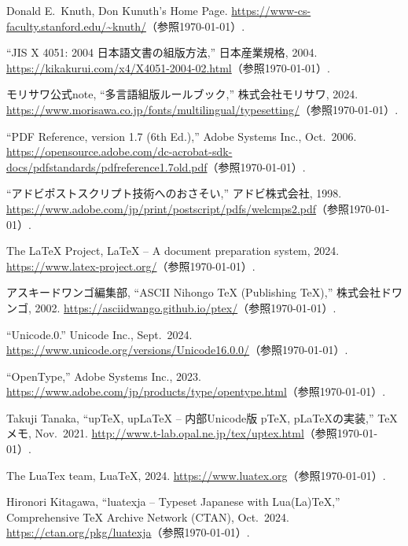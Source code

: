 \begin{thebibliography}{99}
Donald E.\ Knuth, Don Kunuth's Home Page. 
\url{https://www-cs-faculty.stanford.edu/~knuth/}（参照\today）.

``JIS X 4051: 2004 日本語文書の組版方法,'' 日本産業規格, 2004. 
\url{https://kikakurui.com/x4/X4051-2004-02.html}（参照\today）.

モリサワ公式note, ``多言語組版ルールブック,'' 株式会社モリサワ, 2024. 
\url{https://www.morisawa.co.jp/fonts/multilingual/typesetting/}（参照\today）.

``PDF Reference, version 1.7 (6th Ed.),'' Adobe Systems Inc., Oct.\ 2006. 
\url{https://opensource.adobe.com/dc-acrobat-sdk-docs/pdfstandards/pdfreference1.7old.pdf}（参照\today）.

``アドビポストスクリプト技術へのおさそい,'' アドビ株式会社, 1998. 
\url{https://www.adobe.com/jp/print/postscript/pdfs/welcmps2.pdf}（参照\today）.

The {\LaTeX} Project, {\LaTeX} -- A document preparation system, 2024.
\url{https://www.latex-project.org/}（参照\today）.

アスキードワンゴ編集部, ``ASCII Nihongo {\TeX} (Publishing {\TeX}),'' 株式会社ドワンゴ, 2002. 
\url{https://asciidwango.github.io/ptex/}（参照\today）.

 ``Unicode.0.'' Unicode Inc., Sept.\ 2024. 
\url{https://www.unicode.org/versions/Unicode16.0.0/}（参照\today）.

 ``OpenType\textregistered,'' Adobe Systems Inc., 2023. 
\url{https://www.adobe.com/jp/products/type/opentype.html}（参照\today）.

Takuji Tanaka, ``up{\TeX}, up{\LaTeX} -- 内部Unicode版 p{\TeX}, p{\LaTeX}の実装,'' TeXメモ, Nov.\ 2021. 
\url{http://www.t-lab.opal.ne.jp/tex/uptex.html}（参照\today）.

The LuaTex team, Lua{\TeX}, 2024. 
\url{https://www.luatex.org}（参照\today）.

Hironori Kitagawa, ``luatexja -- Typeset Japanese with Lua(La)\TeX,'' Comprehensive {\TeX} Archive Network (CTAN), Oct.\ 2024. 
\url{https://ctan.org/pkg/luatexja}（参照\today）.

\end{thebibliography}